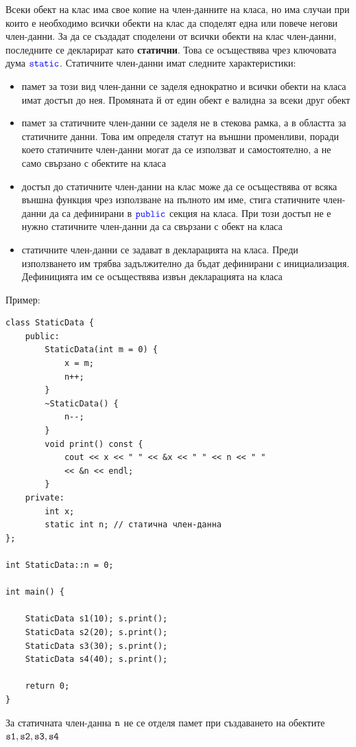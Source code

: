 \documentclass{article}
\begin{document}
Всеки обект на клас има свое копие на член-данните на класа, но има случаи при които е необходимо всички обекти на клас да споделят
една или повече негови член-данни. За да се създадат споделени от всички обекти на клас член-данни, последните се декларират като
\textbf{статични}. Това се осъществява чрез ключовата дума $\textcolor{blue}{\texttt{static}}$. Статичните член-данни имат следните характеристики:
\begin{itemize}
    \item памет за този вид член-данни се заделя еднократно и всички обекти на класа имат достъп до нея. Промяната й от един обект
    е валидна за всеки друг обект
    \item памет за статичните член-данни се заделя не в стекова рамка, а в областта за статичните данни. Това им определя статут
    на външни променливи, поради което статичните член-данни могат да се използват и самостоятелно, а не само свързано с обектите
    на класа
    \item достъп до статичните член-данни на клас може да се осъществява от всяка външна функция чрез използване на пълното им име,
    стига статичните член-данни да са дефинирани в $\textcolor{blue}{\texttt{public}}$ секция на класа. При този достъп не е нужно статичните член-данни да са
    свързани с обект на класа
    \item статичните член-данни се задават в декларацията на класа. Преди използването им трябва задължително да бъдат дефинирани
    с инициализация. Дефиницията им се осъществява извън декларацията на класа
\end{itemize}
Пример: \begin{lstlisting}[style=cpp]
class StaticData {
    public:
        StaticData(int m = 0) {
            x = m;
            n++;
        }
        ~StaticData() {
            n--;
        }
        void print() const {
            cout << x << " " << &x << " " << n << " "
            << &n << endl;
        }
    private:
        int x;
        static int n; // статична член-данна
};

int StaticData::n = 0;

int main() {

    StaticData s1(10); s.print();
    StaticData s2(20); s.print();
    StaticData s3(30); s.print();
    StaticData s4(40); s.print();

    return 0;
}
\end{lstlisting}
За статичната член-данна $\textcolor{black}{\texttt{n}}$ не се отделя памет при създаването на обектите $\textcolor{black}{\texttt{s1}}, \textcolor{black}{\texttt{s2}}, \textcolor{black}{\texttt{s3}}, \textcolor{black}{\texttt{s4}}$
\end{document}
